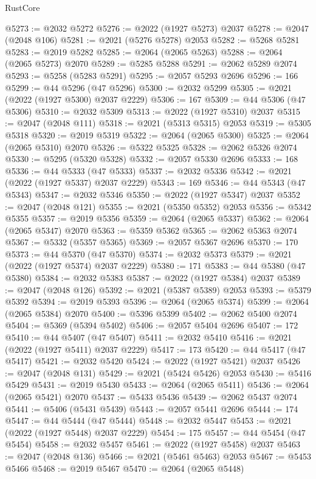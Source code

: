 \begin{lexlean}{RustCore}
\begin{coremodule}
@5273 := @2032 @5272
@5276 := @2022 (@1927 @5273) @2037
@5278 := @2047 (@2048 @106)
@5281 := @2021 (@5276 @5278) @2053
@5282 := @5268 @5281
@5283 := @2019 @5282
@5285 := @2064 (@2065 @5263)
@5288 := @2064 (@2065 @5273) @2070
@5289 := @5285 @5288
@5291 := @2062 @5289 @2074
@5293 := @5258 (@5283 @5291)
@5295 := @2057 @5293 @2696
@5296 := 166
@5299 := @44 @5296 (@47 @5296)
@5300 := @2032 @5299
@5305 := @2021 (@2022 (@1927 @5300) @2037 @2229)
@5306 := 167
@5309 := @44 @5306 (@47 @5306)
@5310 := @2032 @5309
@5313 := @2022 (@1927 @5310) @2037
@5315 := @2047 (@2048 @111)
@5318 := @2021 (@5313 @5315) @2053
@5319 := @5305 @5318
@5320 := @2019 @5319
@5322 := @2064 (@2065 @5300)
@5325 := @2064 (@2065 @5310) @2070
@5326 := @5322 @5325
@5328 := @2062 @5326 @2074
@5330 := @5295 (@5320 @5328)
@5332 := @2057 @5330 @2696
@5333 := 168
@5336 := @44 @5333 (@47 @5333)
@5337 := @2032 @5336
@5342 := @2021 (@2022 (@1927 @5337) @2037 @2229)
@5343 := 169
@5346 := @44 @5343 (@47 @5343)
@5347 := @2032 @5346
@5350 := @2022 (@1927 @5347) @2037
@5352 := @2047 (@2048 @121)
@5355 := @2021 (@5350 @5352) @2053
@5356 := @5342 @5355
@5357 := @2019 @5356
@5359 := @2064 (@2065 @5337)
@5362 := @2064 (@2065 @5347) @2070
@5363 := @5359 @5362
@5365 := @2062 @5363 @2074
@5367 := @5332 (@5357 @5365)
@5369 := @2057 @5367 @2696
@5370 := 170
@5373 := @44 @5370 (@47 @5370)
@5374 := @2032 @5373
@5379 := @2021 (@2022 (@1927 @5374) @2037 @2229)
@5380 := 171
@5383 := @44 @5380 (@47 @5380)
@5384 := @2032 @5383
@5387 := @2022 (@1927 @5384) @2037
@5389 := @2047 (@2048 @126)
@5392 := @2021 (@5387 @5389) @2053
@5393 := @5379 @5392
@5394 := @2019 @5393
@5396 := @2064 (@2065 @5374)
@5399 := @2064 (@2065 @5384) @2070
@5400 := @5396 @5399
@5402 := @2062 @5400 @2074
@5404 := @5369 (@5394 @5402)
@5406 := @2057 @5404 @2696
@5407 := 172
@5410 := @44 @5407 (@47 @5407)
@5411 := @2032 @5410
@5416 := @2021 (@2022 (@1927 @5411) @2037 @2229)
@5417 := 173
@5420 := @44 @5417 (@47 @5417)
@5421 := @2032 @5420
@5424 := @2022 (@1927 @5421) @2037
@5426 := @2047 (@2048 @131)
@5429 := @2021 (@5424 @5426) @2053
@5430 := @5416 @5429
@5431 := @2019 @5430
@5433 := @2064 (@2065 @5411)
@5436 := @2064 (@2065 @5421) @2070
@5437 := @5433 @5436
@5439 := @2062 @5437 @2074
@5441 := @5406 (@5431 @5439)
@5443 := @2057 @5441 @2696
@5444 := 174
@5447 := @44 @5444 (@47 @5444)
@5448 := @2032 @5447
@5453 := @2021 (@2022 (@1927 @5448) @2037 @2229)
@5454 := 175
@5457 := @44 @5454 (@47 @5454)
@5458 := @2032 @5457
@5461 := @2022 (@1927 @5458) @2037
@5463 := @2047 (@2048 @136)
@5466 := @2021 (@5461 @5463) @2053
@5467 := @5453 @5466
@5468 := @2019 @5467
@5470 := @2064 (@2065 @5448)

\end{coremodule}
\end{lexlean}
